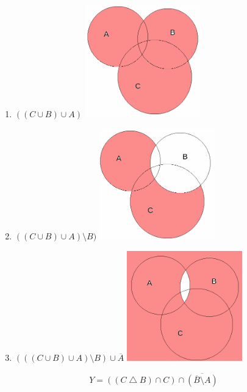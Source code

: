 \documentclass{article}
\begin{document}
\begin{enumerate}
    \item $((C \cup B) \cup A)$
    \includegraphics[width=50mm]{13.png}
    
    \item $((C \cup B) \cup A) \setminus B)$
    \includegraphics[width=50mm]{14.png}
    
    \item $(((C \cup B) \cup A) \setminus B) \cup \overline{A}$
    \includegraphics[width=50mm]{15.png}
\end{enumerate}


\noindent\makebox[\linewidth]{\rule{\paperwidth}{0.4pt}}
$$Y = ((C \bigtriangleup B) \cap C) \cap \overline{(\overline{B} \setminus A)}$$
\end{document}
